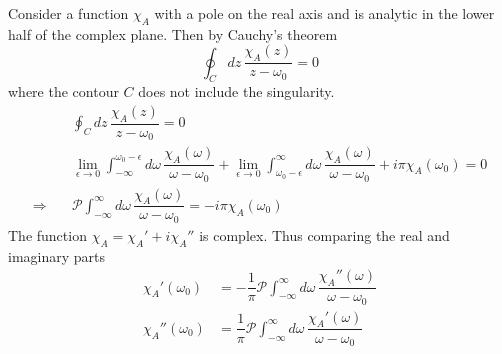 \documentclass[aps,prb,onecolumn,notitlepage,showpacs,floatfix,superscriptaddress]{revtex4-1}
\begin{document}
Consider a function $\chi_A$ with a pole on the real axis and is analytic in the lower half of the complex plane. Then by Cauchy's theorem
\begin{equation}
\oint_C dz\, \dfrac{\chi_A(z)}{z-\omega_0} =0
\end{equation}
where the contour $C$ does not include the singularity.
\begin{equation}
\begin{split}
&\oint_C dz\, \dfrac{\chi_A(z)}{z-\omega_0} =0 \\
&\lim_{\epsilon \rightarrow 0}\int_{-\infty}^{\omega_0-\epsilon} d\omega \, \dfrac{\chi_A(\omega)}{\omega-\omega_0} + \lim_{\epsilon \rightarrow 0} \int_{\omega_0-\epsilon}^\infty d\omega \, \dfrac{\chi_A(\omega)}{\omega-\omega_0} +i \pi \chi_A(\omega_0)=0 \\
\Rightarrow \quad & \mathcal{P}\int_{-\infty}^\infty d\omega \, \dfrac{\chi_A(\omega)}{\omega-\omega_0} = -i\pi \chi_A (\omega_0)
\end{split}
\end{equation}
The function $\chi_A = \chi_A' +i \chi_A''$ is complex. Thus comparing the real and imaginary parts
\begin{equation}
\begin{split} 
 \chi_A' (\omega_0) &=-\dfrac{1}{\pi} \mathcal{P}\int_{-\infty}^\infty d\omega \, \dfrac{\chi_A''(\omega)}{\omega-\omega_0} \\
  \chi_A'' (\omega_0) &= \dfrac{1}{\pi}\mathcal{P}\int_{-\infty}^\infty d\omega \, \dfrac{\chi_A'(\omega)}{\omega-\omega_0} 
\end{split}
\end{equation}
\end{document}
